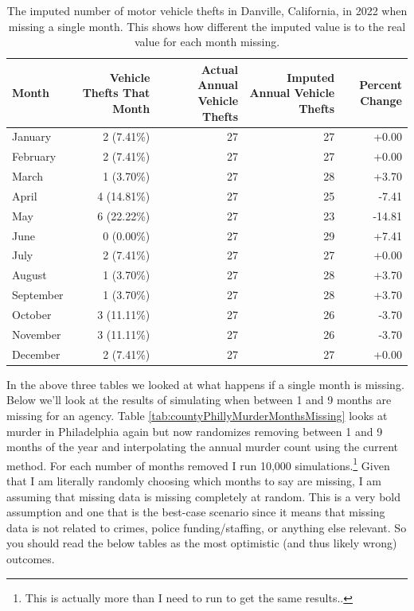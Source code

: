 \documentclass[
  12pt,
  openany]{book}
\begin{document}
\begin{longtable}[t]{lrrrr}
\caption{\label{tab:countyDanvilleVehicle}The imputed number of motor vehicle thefts in Danville, California, in 2022 when missing a single month. This shows how different the imputed value is to the real value for each month missing.}\\
\toprule
Month & Vehicle Thefts That Month & Actual Annual Vehicle Thefts & Imputed Annual Vehicle Thefts & Percent Change\\
\midrule
January & 2 (7.41\%) & 27 & 27 & +0.00\\
February & 2 (7.41\%) & 27 & 27 & +0.00\\
March & 1 (3.70\%) & 27 & 28 & +3.70\\
April & 4 (14.81\%) & 27 & 25 & -7.41\\
May & 6 (22.22\%) & 27 & 23 & -14.81\\
\addlinespace
June & 0 (0.00\%) & 27 & 29 & +7.41\\
July & 2 (7.41\%) & 27 & 27 & +0.00\\
August & 1 (3.70\%) & 27 & 28 & +3.70\\
September & 1 (3.70\%) & 27 & 28 & +3.70\\
October & 3 (11.11\%) & 27 & 26 & -3.70\\
\addlinespace
November & 3 (11.11\%) & 27 & 26 & -3.70\\
December & 2 (7.41\%) & 27 & 27 & +0.00\\
\bottomrule
\end{longtable}

In the above three tables we looked at what happens if a single month is missing. Below we'll look at the results of simulating when between 1 and 9 months are missing for an agency. Table \ref{tab:countyPhillyMurderMonthsMissing} looks at murder in Philadelphia again but now randomizes removing between 1 and 9 months of the year and interpolating the annual murder count using the current method. For each number of months removed I run 10,000 simulations.\footnote{This is actually more than I need to run to get the same results..} Given that I am literally randomly choosing which months to say are missing, I am assuming that missing data is missing completely at random. This is a very bold assumption and one that is the best-case scenario since it means that missing data is not related to crimes, police funding/staffing, or anything else relevant. So you should read the below tables as the most optimistic (and thus likely wrong) outcomes.
\end{document}
